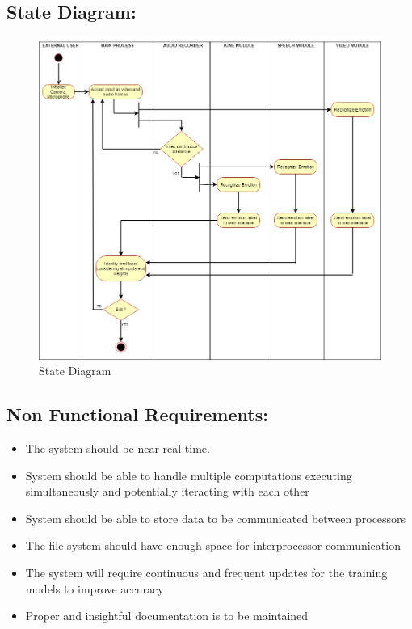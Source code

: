 \documentclass[oneside,a4paper,12pt]{report}
\begin{document}
\begin{normalsize}
\subsection{State Diagram:}
\begin{center}
	\begin{figure}[!htbp]
		\centering
		\includegraphics[width=\textwidth]{activity_proj.jpg}
		\caption{State Diagram}
		\label{fig:statediag}
	\end{figure}
\end{center}  

\subsection{Non Functional Requirements:}
\begin{itemize}
	\item The system should be near real-time.
	\item System should be able to handle multiple computations executing simultaneously and potentially iteracting with each other
	\item System should be able to store data to be communicated between processors
	\item The file system should have enough space for interprocessor communication
	\item The system will require continuous and frequent updates for the training models to improve accuracy
	\item Proper and insightful documentation is to be maintained
\end{itemize} 



\end{normalsize}
\end{document}
